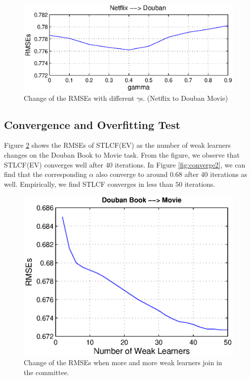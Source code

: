 \begin{figure}[t]
\centering
\includegraphics[width=6.5in]{fig/nf_gamma.eps}
\caption{Change of the RMSEs with different $\gamma$s. (Netflix to Douban Movie)}\label{fig:gamma2}
\end{figure}

\subsection{Convergence and Overfitting Test}
Figure \ref{fig:converge1} shows the RMSEs of STLCF(EV) as the number of weak learners changes on the Douban Book to Movie task. From the figure, we observe that STLCF(EV) converges well after 40 iterations. In Figure \ref{fig:converge2}, we can find that the corresponding $\alpha$ also converge to around 0.68 after 40 iterations as well. Empirically, we find STLCF converges in less than $50$ iterations.


\begin{figure}[t]
\centering
\includegraphics[width=6in]{fig/douban_learners.eps}
\caption{Change of the RMSEs when more and more weak learners join in the committee.}\label{fig:converge1}
\end{figure}

